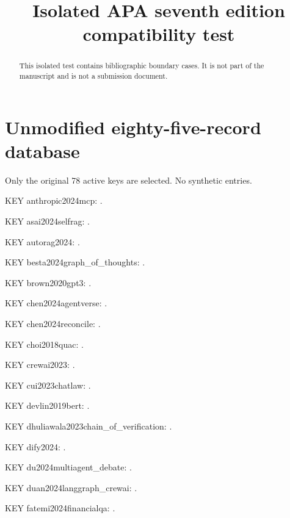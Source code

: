 \documentclass[a4paper,fleqn]{cas-dc}
\newcommand{\restoretestcolumns}{%
  \normalfont\setlength{\columnsep}{18pt}%
  \setlength{\columnwidth}{\dimexpr(\textwidth-\columnsep)/2\relax}%
  \setlength{\hsize}{\columnwidth}\setlength{\linewidth}{\columnwidth}}
\begin{document}
\let\WriteBookmarks\relax
\renewcommand{\printorcid}{}
\title{Isolated APA seventh edition compatibility test}
\begin{abstract}This isolated test contains bibliographic boundary cases.
It is not part of the manuscript and is not a submission document.\end{abstract}
\maketitle\restoretestcolumns
\setlength{\emergencystretch}{1em}
\section{Unmodified eighty-five-record database}
Only the original 78 active keys are selected. No synthetic entries.\par
\noindent KEY anthropic2024mcp: \citep{anthropic2024mcp}.\par
\noindent KEY asai2024selfrag: \citep{asai2024selfrag}.\par
\noindent KEY autorag2024: \citep{autorag2024}.\par
\noindent KEY besta2024graph\_of\_thoughts: \citep{besta2024graph_of_thoughts}.\par
\noindent KEY brown2020gpt3: \citep{brown2020gpt3}.\par
\noindent KEY chen2024agentverse: \citep{chen2024agentverse}.\par
\noindent KEY chen2024reconcile: \citep{chen2024reconcile}.\par
\noindent KEY choi2018quac: \citep{choi2018quac}.\par
\noindent KEY crewai2023: \citep{crewai2023}.\par
\noindent KEY cui2023chatlaw: \citep{cui2023chatlaw}.\par
\noindent KEY devlin2019bert: \citep{devlin2019bert}.\par
\noindent KEY dhuliawala2023chain\_of\_verification: \citep{dhuliawala2023chain_of_verification}.\par
\noindent KEY dify2024: \citep{dify2024}.\par
\noindent KEY du2024multiagent\_debate: \citep{du2024multiagent_debate}.\par
\noindent KEY duan2024langgraph\_crewai: \citep{duan2024langgraph_crewai}.\par
\noindent KEY fatemi2024financialqa: \citep{fatemi2024financialqa}.\par
\end{document}
